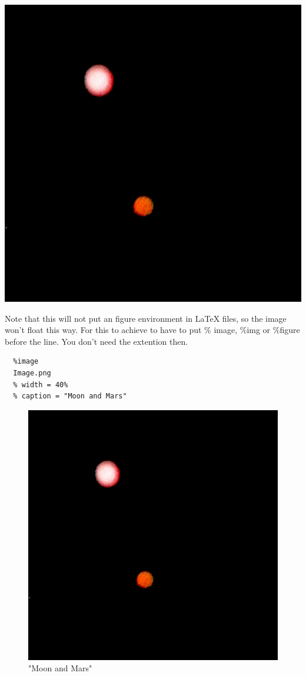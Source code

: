 \documentclass{article}
\begin{document}
\includegraphics[height=.40\textheight]{Image.png}

Note that this will not put an figure environment in LaTeX
files, so the image won't float this way. For this to
achieve to have to put \% image, \%img or \%figure before the
line. You don't need the extention then.

\begin{verbatim}
  %image
  Image.png
  % width = 40%
  % caption = "Moon and Mars"

\end{verbatim}

\begin{figure}[hbt]
\includegraphics[width=.40\linewidth]{Image.png}
\caption{"Moon and Mars"}
\end{figure}
\end{document}
